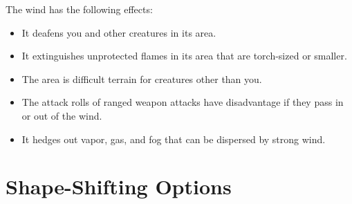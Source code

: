 \documentclass[letterpaper,openany,oneside,twocolumn]{book}
\begin{document}
The wind has the following effects:
\begin{itemize}
	\item It deafens you and other creatures in its area.
	\item It extinguishes unprotected flames in its area that are torch-sized or smaller.
	\item The area is difficult terrain for creatures other than you.
	\item The attack rolls of ranged weapon attacks have disadvantage if they pass in or out of the wind.
	\item It hedges out vapor, gas, and fog that can be dispersed by strong wind.
\end{itemize}

\part*{Shape-Shifting Options}
\end{document}
